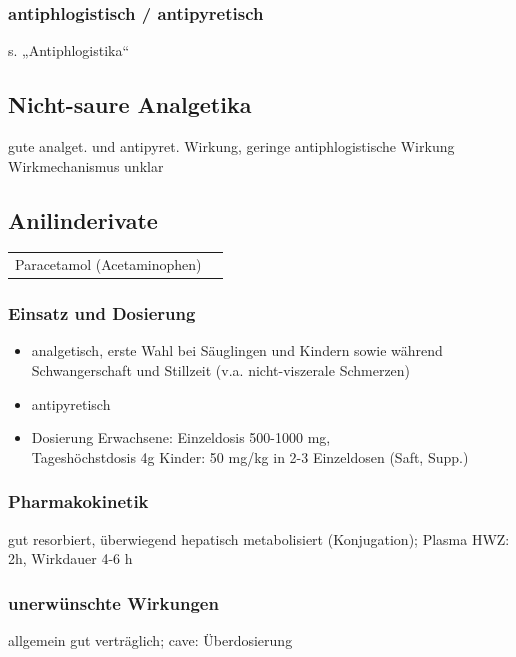 \documentclass[10pt,a4paper]{report}
\begin{document}
\subsubsection{antiphlogistisch /  antipyretisch} %
 \label{par:antiphlogistisch_antipyretisch}
 s. „Antiphlogistika“
\subsection{Nicht-saure Analgetika } %
\label{ssub:nicht_saure_analgetika_}
gute analget. und antipyret. Wirkung, geringe antiphlogistische Wirkung
Wirkmechanismus unklar 
\subsection{Anilinderivate} %
\label{sub:anilinderivate}

\begin{tabularx}{\textwidth}{XX}
Paracetamol (Acetaminophen)	\\  
\end{tabularx} 
\subsubsection{Einsatz und Dosierung} %
\label{par:einsatz_und_dosierung}
\begin{itemize}
	\item analgetisch, erste Wahl bei Säuglingen und Kindern sowie während 	Schwangerschaft und Stillzeit (v.a. nicht-viszerale Schmerzen)
	\item antipyretisch	
	\item Dosierung Erwachsene: 	Einzeldosis 500-1000 mg, \\Tageshöchstdosis 4g
	Kinder:	50 mg/kg in 2-3 Einzeldosen (Saft, Supp.)
\end{itemize}
\subsubsection{Pharmakokinetik} %
\label{par:pharmakokinetik}
gut resorbiert, überwiegend hepatisch metabolisiert (Konjugation); Plasma HWZ: 2h, Wirkdauer 4-6 h 
\subsubsection{unerwünschte Wirkungen} %
 \label{par:unerw_nschte_wirkungen}
 allgemein gut verträglich; cave: Überdosierung
\end{document}

